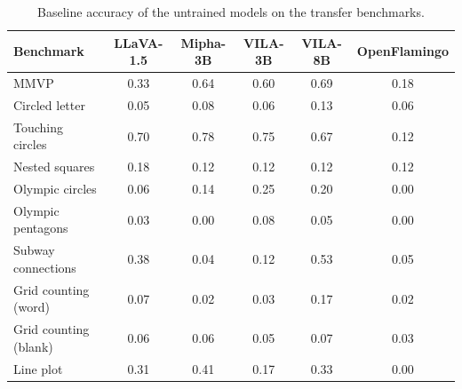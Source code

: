 \begin{table}[h]
\centering
\caption{Baseline accuracy of the untrained models on the transfer benchmarks.}
\label{tab:benchmark_base}
\footnotesize
\setlength{\tabcolsep}{2pt}
\begin{tabular}{lccccc}
\toprule
Benchmark & LLaVA-1.5 & Mipha-3B & VILA-3B & VILA-8B & OpenFlamingo \\
\midrule
MMVP                  & 0.33 & 0.64 & 0.60 & 0.69 & 0.18 \\
\midrule
Circled letter        & 0.05 & 0.08 & 0.06 & 0.13 & 0.06 \\
Touching circles      & 0.70 & 0.78 & 0.75 & 0.67 & 0.12 \\
Nested squares        & 0.18 & 0.12 & 0.12 & 0.12 & 0.12 \\
Olympic circles       & 0.06 & 0.14 & 0.25 & 0.20 & 0.00 \\
Olympic pentagons     & 0.03 & 0.00 & 0.08 & 0.05 & 0.00 \\
Subway connections    & 0.38 & 0.04 & 0.12 & 0.53 & 0.05 \\
Grid counting (word)  & 0.07 & 0.02 & 0.03 & 0.17 & 0.02 \\
Grid counting (blank) & 0.06 & 0.06 & 0.05 & 0.07 & 0.03 \\
Line plot             & 0.31 & 0.41 & 0.17 & 0.33 & 0.00 \\
\bottomrule
\end{tabular}
\end{table}
